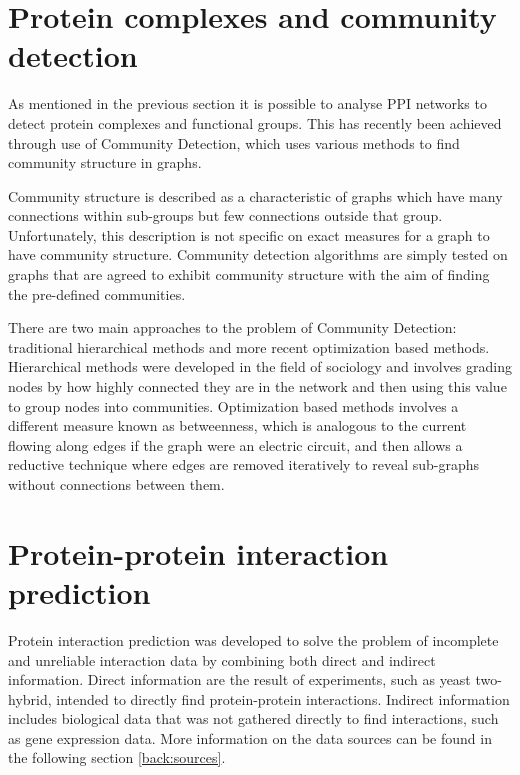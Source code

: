 \section{Protein complexes and community detection}

As mentioned in the previous section it is possible to analyse PPI networks to detect protein complexes and functional groups.
This has recently been achieved through use of Community Detection\autocites{chen_identifying_2013,wang_recent_2010}, which uses various methods to find community structure in graphs.

Community structure is described as a characteristic of graphs which have many connections within sub-groups but few connections outside that group\autocite{newman_communities_2012}.
Unfortunately, this description is not specific on exact measures for a graph to have community structure.
Community detection algorithms are simply tested on graphs that are agreed to exhibit community structure with the aim of finding the pre-defined communities.

There are two main approaches to the problem of Community Detection: traditional hierarchical methods and more recent optimization based methods\autocite{newman_communities_2012}.
Hierarchical methods were developed in the field of sociology and involves grading nodes by how highly connected they are in the network and then using this value to group nodes into communities.
Optimization based methods involves a different measure known as betweenness, which is analogous to the current flowing along edges if the graph were an electric circuit, and then allows a reductive technique where edges are removed iteratively to reveal sub-graphs without connections between them.



\section{Protein-protein interaction prediction}

Protein interaction prediction was developed to solve the problem of incomplete and unreliable interaction data by combining both direct and indirect information\autocite{qi_learning_2008}.
Direct information are the result of experiments, such as yeast two-hybrid, intended to directly find protein-protein interactions.
Indirect information includes biological data that was not gathered directly to find interactions, such as gene expression data.
More information on the data sources can be found in the following section \ref{back:sources}.

